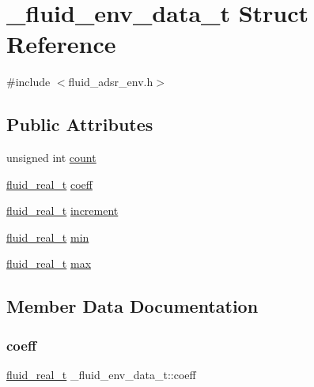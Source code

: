\hypertarget{struct__fluid__env__data__t}{}\section{\+\_\+fluid\+\_\+env\+\_\+data\+\_\+t Struct Reference}
\label{struct__fluid__env__data__t}


{\ttfamily \#include $<$fluid\+\_\+adsr\+\_\+env.\+h$>$}

\subsection*{Public Attributes}
\begin{DoxyCompactItemize}
\item 
unsigned int \hyperlink{struct__fluid__env__data__t_ab7af0cb95ac62d9785112aeb45d364d0}{count}
\item 
\hyperlink{fluidsynth__priv_8h_a9e96f0917747b69cabb7c671bc693dbb}{fluid\+\_\+real\+\_\+t} \hyperlink{struct__fluid__env__data__t_a4ba351506b7b88dc0f3c1ccf0ad6ac3b}{coeff}
\item 
\hyperlink{fluidsynth__priv_8h_a9e96f0917747b69cabb7c671bc693dbb}{fluid\+\_\+real\+\_\+t} \hyperlink{struct__fluid__env__data__t_a04bee48c46dd70e1b1e57f38da2c30d1}{increment}
\item 
\hyperlink{fluidsynth__priv_8h_a9e96f0917747b69cabb7c671bc693dbb}{fluid\+\_\+real\+\_\+t} \hyperlink{struct__fluid__env__data__t_ab041e37f198c03d8400c4baa961fbdbb}{min}
\item 
\hyperlink{fluidsynth__priv_8h_a9e96f0917747b69cabb7c671bc693dbb}{fluid\+\_\+real\+\_\+t} \hyperlink{struct__fluid__env__data__t_a15e036b9f52eb8af6169b785e3f3a6bc}{max}
\end{DoxyCompactItemize}


\subsection{Member Data Documentation}
\mbox{\label{struct__fluid__env__data__t_a4ba351506b7b88dc0f3c1ccf0ad6ac3b}} 
\subsubsection{\texorpdfstring{coeff}{coeff}}
{\footnotesize\ttfamily \hyperlink{fluidsynth__priv_8h_a9e96f0917747b69cabb7c671bc693dbb}{fluid\+\_\+real\+\_\+t} \+\_\+fluid\+\_\+env\+\_\+data\+\_\+t\+::coeff}

